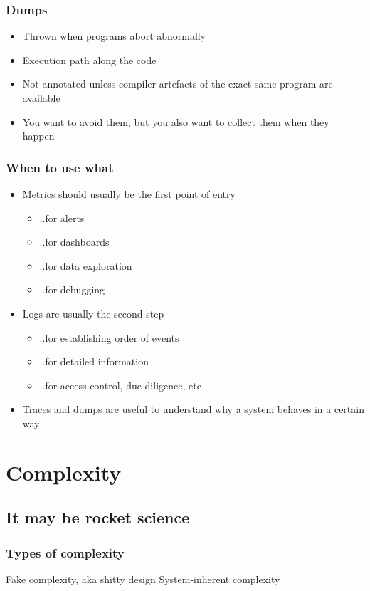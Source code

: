 \documentclass[t]{beamer}
\begin{document}
\begin{frame}
	\frametitle{Dumps}
	\begin{itemize}
		\item Thrown when programs abort abnormally
		\item Execution path along the code
		\item Not annotated unless compiler artefacts of the exact same program are available
		\item You want to avoid them, but you also want to collect them when they happen
	\end{itemize}
\end{frame}

\begin{frame}
	\frametitle{When to use what}
	\begin{itemize}
		\item Metrics should usually be the first point of entry
		\begin{itemize}
			\item ..for alerts
			\item ..for dashboards
			\item ..for data exploration
			\item ..for debugging
		\end{itemize}
		\item Logs are usually the second step
		\begin{itemize}
			\item ..for establishing order of events
			\item ..for detailed information
			\item ..for access control, due diligence, etc
		\end{itemize}
		\item Traces and dumps are useful to understand why a system behaves in a certain way
	\end{itemize}
\end{frame}



\section{Complexity}


\subsection{It may be rocket science}

\begin{frame}
	\frametitle{Types of complexity}
	\begin{center}
		\vfill
		Fake complexity, aka shitty design
		\vfill
		System-inherent complexity
		\vfill
	\end{center}
\end{frame}
\end{document}
